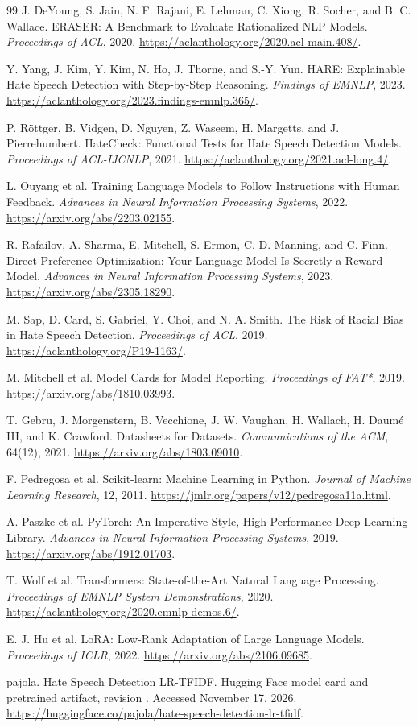 \documentclass[11pt,a4paper]{article}
\newcommand{\artifact}[1]{\texttt{\detokenize{#1}}}
\begin{document}
\begin{thebibliography}{99}
J. DeYoung, S. Jain, N. F. Rajani, E. Lehman, C. Xiong, R. Socher, and B. C. Wallace.
ERASER: A Benchmark to Evaluate Rationalized NLP Models.
\emph{Proceedings of ACL}, 2020.
\url{https://aclanthology.org/2020.acl-main.408/}.

Y. Yang, J. Kim, Y. Kim, N. Ho, J. Thorne, and S.-Y. Yun.
HARE: Explainable Hate Speech Detection with Step-by-Step Reasoning.
\emph{Findings of EMNLP}, 2023.
\url{https://aclanthology.org/2023.findings-emnlp.365/}.

P. R\"{o}ttger, B. Vidgen, D. Nguyen, Z. Waseem, H. Margetts, and J. Pierrehumbert.
HateCheck: Functional Tests for Hate Speech Detection Models.
\emph{Proceedings of ACL-IJCNLP}, 2021.
\url{https://aclanthology.org/2021.acl-long.4/}.

L. Ouyang et al.
Training Language Models to Follow Instructions with Human Feedback.
\emph{Advances in Neural Information Processing Systems}, 2022.
\url{https://arxiv.org/abs/2203.02155}.

R. Rafailov, A. Sharma, E. Mitchell, S. Ermon, C. D. Manning, and C. Finn.
Direct Preference Optimization: Your Language Model Is Secretly a Reward Model.
\emph{Advances in Neural Information Processing Systems}, 2023.
\url{https://arxiv.org/abs/2305.18290}.

M. Sap, D. Card, S. Gabriel, Y. Choi, and N. A. Smith.
The Risk of Racial Bias in Hate Speech Detection.
\emph{Proceedings of ACL}, 2019.
\url{https://aclanthology.org/P19-1163/}.

M. Mitchell et al. Model Cards for Model Reporting.
\emph{Proceedings of FAT*}, 2019.
\url{https://arxiv.org/abs/1810.03993}.

T. Gebru, J. Morgenstern, B. Vecchione, J. W. Vaughan, H. Wallach,
H. Daum\'{e} III, and K. Crawford.
Datasheets for Datasets.
\emph{Communications of the ACM}, 64(12), 2021.
\url{https://arxiv.org/abs/1803.09010}.

F. Pedregosa et al. Scikit-learn: Machine Learning in Python.
\emph{Journal of Machine Learning Research}, 12, 2011.
\url{https://jmlr.org/papers/v12/pedregosa11a.html}.

A. Paszke et al.
PyTorch: An Imperative Style, High-Performance Deep Learning Library.
\emph{Advances in Neural Information Processing Systems}, 2019.
\url{https://arxiv.org/abs/1912.01703}.

T. Wolf et al. Transformers: State-of-the-Art Natural Language Processing.
\emph{Proceedings of EMNLP System Demonstrations}, 2020.
\url{https://aclanthology.org/2020.emnlp-demos.6/}.

E. J. Hu et al. LoRA: Low-Rank Adaptation of Large Language Models.
\emph{Proceedings of ICLR}, 2022.
\url{https://arxiv.org/abs/2106.09685}.

pajola. Hate Speech Detection LR-TFIDF.
Hugging Face model card and pretrained artifact, revision
\artifact{8523992895f5145361e49212af7f1d6c94b8f7a9}.
Accessed November 17, 2026.
\url{https://huggingface.co/pajola/hate-speech-detection-lr-tfidf}.
\end{thebibliography}
\end{document}

